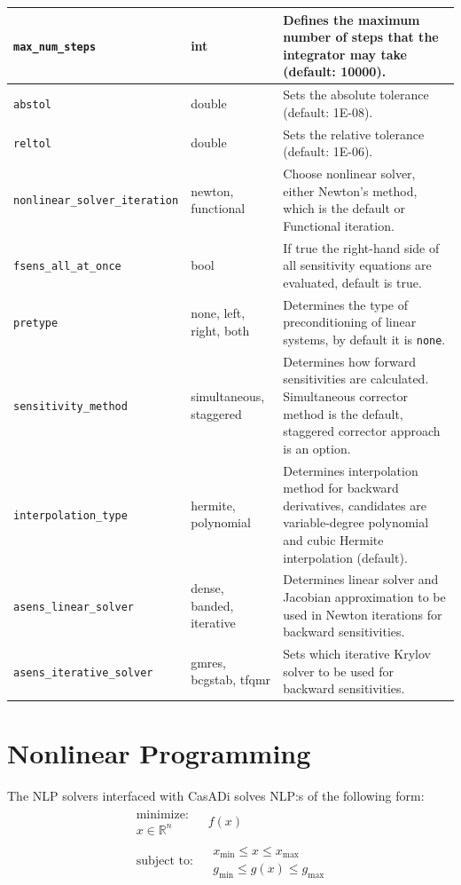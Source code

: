 \documentclass[a4paper,12pt]{book}
\begin{document}
{\begin{center}
\begin{tabular}{|m{5.3cm}|m{2.3cm}|m{17cm}|}
 \hline
 \texttt{max\_num\_steps} & int & Defines the maximum number of steps that the integrator may take (default: 10000).\\
 \hline
 \texttt{abstol}& double & Sets the absolute tolerance (default: 1E-08).\\
 \hline
 \texttt{reltol}& double & Sets the relative tolerance (default: 1E-06).\\
 \hline
 \texttt{nonlinear\_solver\_iteration} & newton, functional & Choose nonlinear solver, either Newton's method, which is the default
 or Functional iteration.  \\
 \hline
 \texttt{fsens\_all\_at\_once} & bool & If true the right-hand side of all sensitivity equations are evaluated, default is true. \\
 \hline
 \texttt{pretype} & none, left, right, both & Determines the type of preconditioning of linear systems, by default it is \texttt{none}.  \\
 \hline
 \texttt{sensitivity\_method} &  simultaneous, staggered & Determines how forward sensitivities are calculated. 
 Simultaneous corrector method is the default, staggered corrector approach is an option. \\
 \hline
 \texttt{interpolation\_type} & hermite, polynomial & Determines interpolation method for backward derivatives, candidates are 
 variable-degree polynomial and cubic Hermite interpolation (default).  \\
 \hline
 \texttt{asens\_linear\_solver} & dense, banded, iterative & Determines linear solver and Jacobian approximation to be used in Newton iterations
 for backward sensitivities. \\
 \hline
 \texttt{asens\_iterative\_solver} & gmres, bcgstab, tfqmr & Sets which iterative Krylov solver to be used for backward sensitivities.\\
 \hline
 \end{tabular}
 \end{center}
\chapter{Nonlinear Programming}
The NLP solvers interfaced with CasADi solves NLP:s of the following form:
\begin{equation}
\begin{array}{cc}
\begin{array}{c}
\text{minimize:} \\
x \in \mathbb{R}^n
\end{array}
&
f(x)
\\
\begin{array}{c}
\text{subject to:}
\end{array}
&
\begin{array}{c}
x_{\min} \le x \le x_{\max} \\
g_{\min} \le g(x) \le g_{\max}
\end{array}
\end{array}
\end{equation}

}
\end{document}
